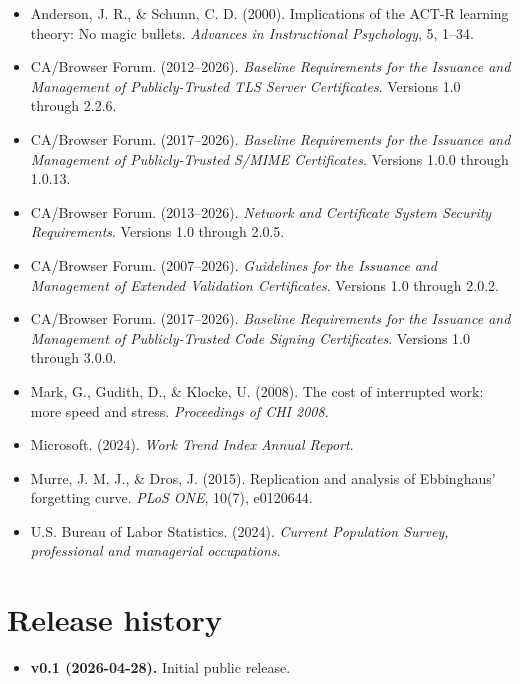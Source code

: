 \documentclass[11pt,letterpaper]{article}
\begin{document}
\begin{itemize}[leftmargin=1em, label={}]
\item Anderson, J. R., \& Schunn, C. D. (2000). Implications of the ACT-R learning theory: No magic bullets. \textit{Advances in Instructional Psychology}, 5, 1--34.
\item CA/Browser Forum. (2012--2026). \textit{Baseline Requirements for the Issuance and Management of Publicly-Trusted TLS Server Certificates}. Versions 1.0 through 2.2.6.
\item CA/Browser Forum. (2017--2026). \textit{Baseline Requirements for the Issuance and Management of Publicly-Trusted S/MIME Certificates}. Versions 1.0.0 through 1.0.13.
\item CA/Browser Forum. (2013--2026). \textit{Network and Certificate System Security Requirements}. Versions 1.0 through 2.0.5.
\item CA/Browser Forum. (2007--2026). \textit{Guidelines for the Issuance and Management of Extended Validation Certificates}. Versions 1.0 through 2.0.2.
\item CA/Browser Forum. (2017--2026). \textit{Baseline Requirements for the Issuance and Management of Publicly-Trusted Code Signing Certificates}. Versions 1.0 through 3.0.0.
\item Mark, G., Gudith, D., \& Klocke, U. (2008). The cost of interrupted work: more speed and stress. \textit{Proceedings of CHI 2008}.
\item Microsoft. (2024). \textit{Work Trend Index Annual Report}.
\item Murre, J. M. J., \& Dros, J. (2015). Replication and analysis of Ebbinghaus' forgetting curve. \textit{PLoS ONE}, 10(7), e0120644.
\item U.S. Bureau of Labor Statistics. (2024). \textit{Current Population Survey, professional and managerial occupations}.
\end{itemize}

\appendix
\section{Release history}
\label{sec:releasehistory}

\begin{itemize}[leftmargin=1.2em]
\item \textbf{v0.1 (2026-04-28).} Initial public release.
\end{itemize}
\end{document}
